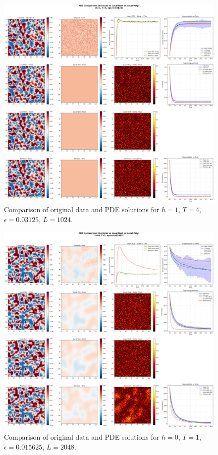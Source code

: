 \documentclass[11pt,a4paper]{article}
\begin{document}
\begin{figure}[h]
    \centering
    \includegraphics[width=1.0\textwidth]{fig/compare_pde_solvers_L1024_h1_T4_eps0.03125.png}
    \caption{Comparison of original data and PDE solutions for $h=1$, $T=4$, $\epsilon=0.03125$, $L=1024$.}
    \label{fig:pde_comparison_h1_T4_eps0.03125}
\end{figure}




\begin{figure}[!h]
    \centering
    \includegraphics[width=1.0\textwidth]{fig/compare_pde_solvers_L2048_h0_T1_eps0.015625.png}
    \caption{Comparison of original data and PDE solutions for $h=0$, $T=1$, $\epsilon=0.015625$, $L=2048$.}
    \label{fig:pde_comparison_h0_T1_eps0.015625_L2048}
\end{figure}
\end{document}
